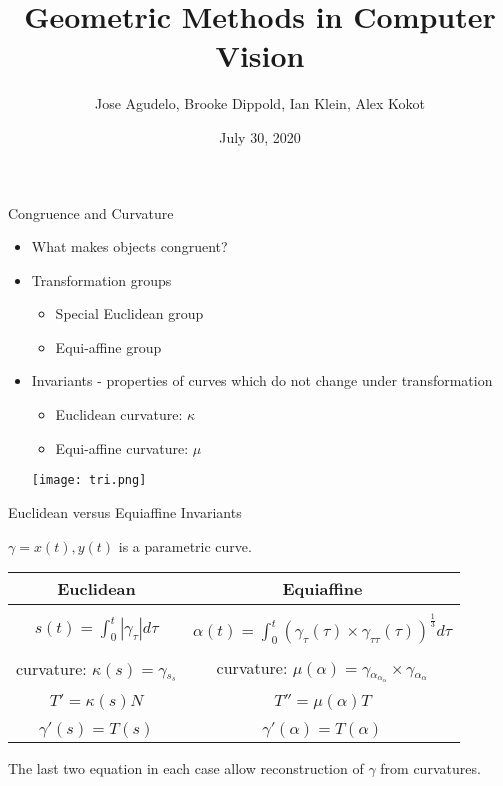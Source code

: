 \documentclass[]{beamer}
\title{Geometric Methods in Computer Vision}
\author{Jose Agudelo, Brooke Dippold, Ian Klein, Alex Kokot}
\date{July 30, 2020}
\begin{document}
\frame{\titlepage}

\begin{frame}{Congruence and Curvature}
\begin{itemize}
    \item What makes objects congruent?
    \item Transformation groups
    \begin{itemize}
        \item Special Euclidean group
        \item Equi-affine group
    \end{itemize}
    \item Invariants - properties of curves which do not change under transformation
    \begin{itemize}
        \item Euclidean curvature: $\kappa$
        \item Equi-affine curvature: $\mu$
    \end{itemize}
\begin{center}
\texttt{[image: tri.png]}
\end{center}
\end{itemize}
    
\end{frame}

\begin{frame}{Euclidean versus Equiaffine Invariants}

$\gamma = x(t), y(t)$ is a parametric curve.  
\vspace{0.5cm}
\begin{center}
\begin{tabular}[h]{|c|c|}
\hline 
    Euclidean & Equiaffine \\
    \hline 
       & \\
    $s(t) = \int_{0}^{t} |\gamma_{\tau} | d\tau $ & $\alpha(t) = \int_{0}^{t} (\gamma_\tau (\tau) \times \gamma_{\tau\tau}(\tau))^{\frac{1}{3}} d\tau$ \\
       & \\
   curvature:  $\kappa(s) = \gamma{_s_s}$ &curvature: $\mu(\alpha) = \gamma {_\alpha _\alpha _ \alpha} \times \gamma {_\alpha_\alpha} $\\
       & \\
    $T' = \kappa(s) N$ & $T'' = \mu(\alpha) T$\\ 
       & \\
    $\gamma'(s) = T(s)$ & $\gamma'(\alpha) = T(\alpha)$\\
\hline 
\end{tabular}
\end{center}
The last two equation in each case allow reconstruction of $\gamma$ from curvatures. 
\end{frame}
\end{document}
